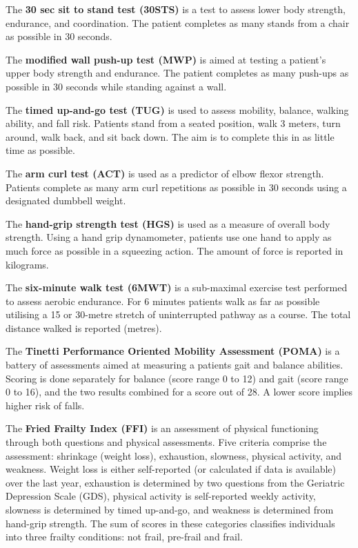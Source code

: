 \documentclass[
]{article}
\begin{document}
\label{outcome:30sts}
The \textbf{30 sec sit to stand test (30STS)} \cites{rikli1999development}{jones199930}{macfarlane2006validity} is a test to assess lower body strength, endurance, and coordination.
The patient completes as many stands from a chair as possible in 30 seconds.

\label{outcome:mwp}
The \textbf{modified wall push-up test (MWP)} is aimed at testing a patient’s upper body strength and endurance. 
The patient completes as many push-ups as possible in 30 seconds while standing against a wall. 

\label{outcome:tug}
The \textbf{timed up-and-go test (TUG)} \cites{podsiadlo1991timed}{shumway2000predicting} is used to assess mobility, balance, walking ability, and fall risk.
Patients stand from a seated position, walk 3 meters, turn around, walk back, and sit back down. 
The aim is to complete this in as little time as possible.

\label{outcome:act}
The \textbf{arm curl test (ACT)} \cites{rikli1999development}{liu2017predicting} is used as a predictor of elbow flexor strength. 
Patients complete as many arm curl repetitions as possible in 30 seconds using a designated dumbbell weight.

\label{outcome:hgs}
The \textbf{hand-grip strength test (HGS)} \cite{liu2017predicting} is used as a measure of overall body strength.
Using a hand grip dynamometer, patients use one hand to apply as much force as possible in a squeezing action.
The amount of force is reported in kilograms.

\label{outcome:6mwt}
The \textbf{six-minute walk test (6MWT)} \cites{butland1982two}{buvcar2016six} is a sub-maximal exercise test performed to assess aerobic endurance. 
For 6 minutes patients walk as far as possible utilising a 15 or 30-metre stretch of uninterrupted pathway as a course.
The total distance walked is reported (metres).

\label{outcome:poma}
The \textbf{Tinetti Performance Oriented Mobility Assessment (POMA)} \cites{tinetti1986fall}{wyngaert2020associations} is a battery of assessments aimed at measuring a patients gait and balance abilities.
Scoring is done separately for balance (score range 0 to 12) and gait (score range 0 to 16), and the two results combined for a score out of 28.
A lower score implies higher risk of falls.

\label{outcome:ffi}
The \textbf{Fried Frailty Index (FFI)} \cites{fried2001frailty}{het2015fried} is an assessment of physical functioning through both questions and physical assessments.
Five criteria comprise the assessment: shrinkage (weight loss), exhaustion, slowness, physical activity, and weakness.
Weight loss is either self-reported (or calculated if data is available) over the last year, exhaustion is determined by two questions from the Geriatric Depression Scale (GDS), physical activity is self-reported weekly activity, slowness is determined by timed up-and-go, and weakness is determined from hand-grip strength.
The sum of scores in these categories classifies individuals into three frailty conditions: not frail, pre-frail and frail. 
\end{document}
